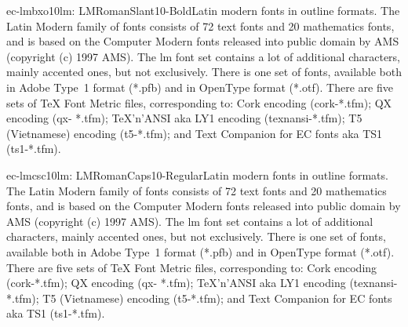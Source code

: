 \documentclass{ddltxtyp}
\begin{document}
\begin{package}{ec-lmbxo10}{lm: LMRomanSlant10-Bold}{Latin modern fonts in outline formats.}
The Latin Modern family of fonts consists of 72 text fonts and
20 mathematics fonts, and is based on the Computer Modern fonts
released into public domain by AMS (copyright (c) 1997 AMS).
The lm font set contains a lot of additional characters, mainly
accented ones, but not exclusively. There is one set of fonts,
available both in Adobe Type~1 format (*.pfb) and in OpenType
format (*.otf). There are five sets of {\TeX} Font Metric files,
corresponding to: Cork encoding (cork-*.tfm); QX encoding (qx-
*.tfm); {\TeX}'n'ANSI aka LY1 encoding (texnansi-*.tfm); T5
(Vietnamese) encoding (t5-*.tfm); and Text Companion for EC
fonts aka TS1 (ts1-*.tfm).
\end{package}
\begin{package}{ec-lmcsc10}{lm: LMRomanCaps10-Regular}{Latin modern fonts in outline formats.}
The Latin Modern family of fonts consists of 72 text fonts and
20 mathematics fonts, and is based on the Computer Modern fonts
released into public domain by AMS (copyright (c) 1997 AMS).
The lm font set contains a lot of additional characters, mainly
accented ones, but not exclusively. There is one set of fonts,
available both in Adobe Type~1 format (*.pfb) and in OpenType
format (*.otf). There are five sets of {\TeX} Font Metric files,
corresponding to: Cork encoding (cork-*.tfm); QX encoding (qx-
*.tfm); {\TeX}'n'ANSI aka LY1 encoding (texnansi-*.tfm); T5
(Vietnamese) encoding (t5-*.tfm); and Text Companion for EC
fonts aka TS1 (ts1-*.tfm).
\end{package}
\end{document}
